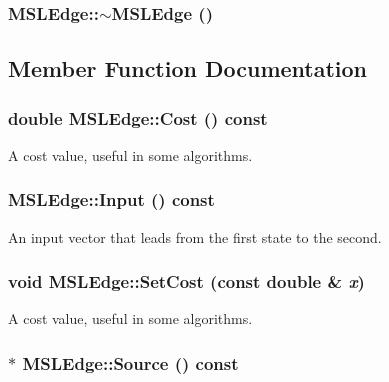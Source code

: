 \subsubsection{\setlength{\rightskip}{0pt plus 5cm}MSLEdge::$\sim$MSLEdge ()\hspace{0.3cm}{\tt  [inline]}}\label{classMSLEdge_a4}




\subsection{Member Function Documentation}
\subsubsection{\setlength{\rightskip}{0pt plus 5cm}double MSLEdge::Cost () const\hspace{0.3cm}{\tt  [inline]}}\label{classMSLEdge_a6}


A cost value, useful in some algorithms.

\subsubsection{ MSLEdge::Input () const\hspace{0.3cm}{\tt  [inline]}}\label{classMSLEdge_a8}


An input vector that leads from the first state to the second.

\subsubsection{\setlength{\rightskip}{0pt plus 5cm}void MSLEdge::Set\-Cost (const double \& {\em x})\hspace{0.3cm}{\tt  [inline]}}\label{classMSLEdge_a7}


A cost value, useful in some algorithms.

\subsubsection{ $\ast$ MSLEdge::Source () const\hspace{0.3cm}{\tt  [inline]}}\label{classMSLEdge_a9}


